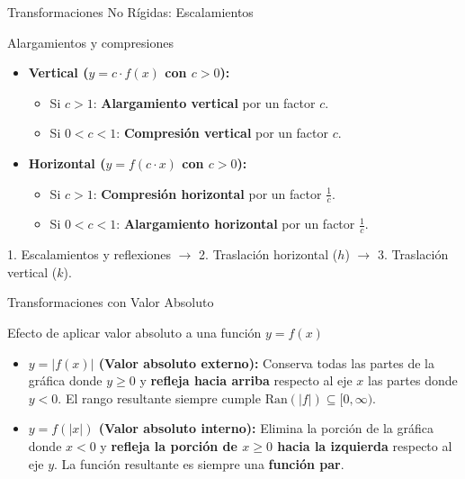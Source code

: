 \documentclass[aspectratio=169]{beamer}
\begin{document}
\begin{frame}{Transformaciones No Rígidas: Escalamientos}
  \begin{block}{Alargamientos y compresiones}
    \begin{itemize}
      \item \textbf{Vertical ($y = c \cdot f(x)$ con $c > 0$):}
            \begin{itemize}
              \item Si $c > 1$: \textbf{Alargamiento vertical} por un factor $c$.
              \item Si $0 < c < 1$: \textbf{Compresión vertical} por un factor $c$.
            \end{itemize}
      \item \textbf{Horizontal ($y = f(c \cdot x)$ con $c > 0$):}
            \begin{itemize}
              \item Si $c > 1$: \textbf{Compresión horizontal} por un factor $\frac{1}{c}$.
              \item Si $0 < c < 1$: \textbf{Alargamiento horizontal} por un factor $\frac{1}{c}$.
            \end{itemize}
    \end{itemize}
  \end{block}

  \vspace{4pt}
  \begin{mwpasos}[Orden estándar para graficar $y = a \cdot f(b(x - h)) + k$]
    1. Escalamientos y reflexiones $\longrightarrow$ 2. Traslación horizontal ($h$) $\longrightarrow$ 3. Traslación vertical ($k$).
  \end{mwpasos}
\end{frame}

\begin{frame}{Transformaciones con Valor Absoluto}
  \begin{block}{Efecto de aplicar valor absoluto a una función $y = f(x)$}
    \begin{itemize}
      \item \textbf{$y = |f(x)|$ (Valor absoluto externo):}
            Conserva todas las partes de la gráfica donde $y \ge 0$ y \textbf{refleja hacia arriba} respecto al eje $x$ las partes donde $y < 0$. El rango resultante siempre cumple $\text{Ran}(|f|) \subseteq [0, \infty)$.
      \item \textbf{$y = f(|x|)$ (Valor absoluto interno):}
            Elimina la porción de la gráfica donde $x < 0$ y \textbf{refleja la porción de $x \ge 0$ hacia la izquierda} respecto al eje $y$. La función resultante es siempre una \textbf{función par}.
    \end{itemize}
  \end{block}
\end{frame}
\end{document}
